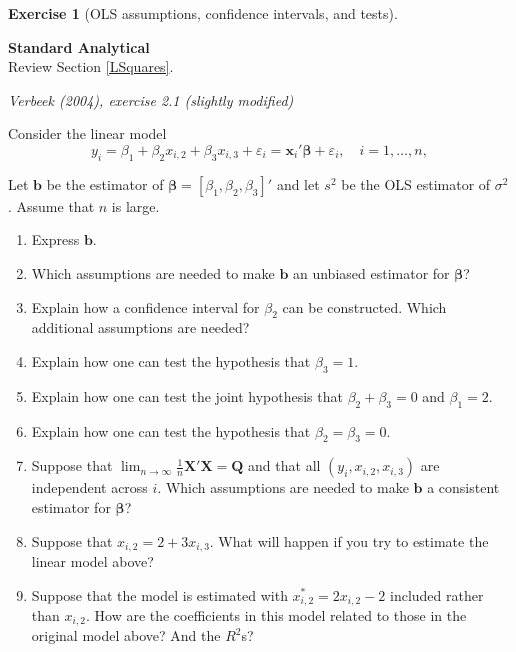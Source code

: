 \documentclass[
  11pt,
]{book}
\theoremstyle{definition}
\theoremstyle{definition}
\theoremstyle{definition}
\newtheorem{exercise}{Exercise}[chapter]
\theoremstyle{definition}
\theoremstyle{remark}
\begin{document}
\begin{exercisebox}

\begin{exercise}[OLS assumptions, confidence intervals, and tests]
\protect\hypertarget{exr:regressions-ols-properties}{}\label{exr:regressions-ols-properties}

\textbf{Standard \textbar{} Analytical}\\
Review Section \ref{LSquares}.

\emph{Verbeek (2004), exercise 2.1 (slightly modified)}

Consider the linear model \[y_i = \beta_1 + \beta_2 x_{i,2} + \beta_3 x_{i,3} + \varepsilon_i = \mathbf{x}_i' \boldsymbol{\beta} + \varepsilon_i, \quad i = 1, \dots, n,\]

Let \(\mathbf{b}\) be the estimator of \(\boldsymbol{\beta} = [\beta_1, \beta_2, \beta_3]'\) and let \(s^2\) be the OLS estimator of \(\sigma^2\). Assume that \(n\) is large.

\begin{enumerate}
\def\labelenumi{\arabic{enumi}.}
\item
  Express \(\mathbf{b}\).
\item
  Which assumptions are needed to make \(\mathbf{b}\) an unbiased estimator for \(\boldsymbol{\beta}\)?
\item
  Explain how a confidence interval for \(\beta_2\) can be constructed. Which additional assumptions are needed?
\item
  Explain how one can test the hypothesis that \(\beta_3 = 1\).
\item
  Explain how one can test the joint hypothesis that \(\beta_2 + \beta_3 = 0\) and \(\beta_1 = 2\).
\item
  Explain how one can test the hypothesis that \(\beta_2 = \beta_3 = 0\).
\item
  Suppose that \(\lim_{n \to \infty} \frac{1}{n} \mathbf{X}'\mathbf{X} = \mathbf{Q}\) and that all \((y_i, x_{i,2}, x_{i,3})\) are independent across \(i\). Which assumptions are needed to make \(\mathbf{b}\) a consistent estimator for \(\boldsymbol{\beta}\)?
\item
  Suppose that \(x_{i,2} = 2 + 3x_{i,3}\). What will happen if you try to estimate the linear model above?
\item
  Suppose that the model is estimated with \(x_{i,2}^* = 2x_{i,2} - 2\) included rather than \(x_{i,2}\). How are the coefficients in this model related to those in the original model above? And the \(R^2\)s?
\end{enumerate}

\end{exercise}

\end{exercisebox}
\end{document}
